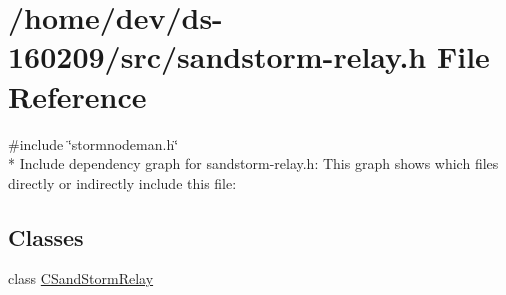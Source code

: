 \hypertarget{sandstorm-relay_8h}{}\section{/home/dev/ds-\/160209/src/sandstorm-\/relay.h File Reference}
\label{sandstorm-relay_8h}
{\ttfamily \#include \char`\"{}stormnodeman.\+h\char`\"{}}\\*
Include dependency graph for sandstorm-\/relay.h\+:
This graph shows which files directly or indirectly include this file\+:
\subsection*{Classes}
\begin{DoxyCompactItemize}
\item 
class \hyperlink{class_c_sand_storm_relay}{C\+Sand\+Storm\+Relay}
\end{DoxyCompactItemize}
